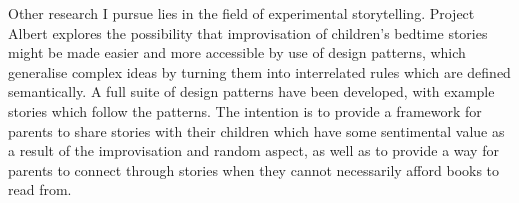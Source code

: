 Other research I pursue lies in the field of experimental storytelling. Project Albert explores the possibility that improvisation of children's bedtime stories might be made easier and more accessible by use of design patterns, which generalise complex ideas by turning them into interrelated rules which are defined semantically. A full suite of design patterns have been developed, with example stories which follow the patterns. The intention is to provide a framework for parents to share stories with their children which have some sentimental value as a result of the improvisation and random aspect, as well as to provide a way for parents to connect through stories when they cannot necessarily afford books to read from. 




